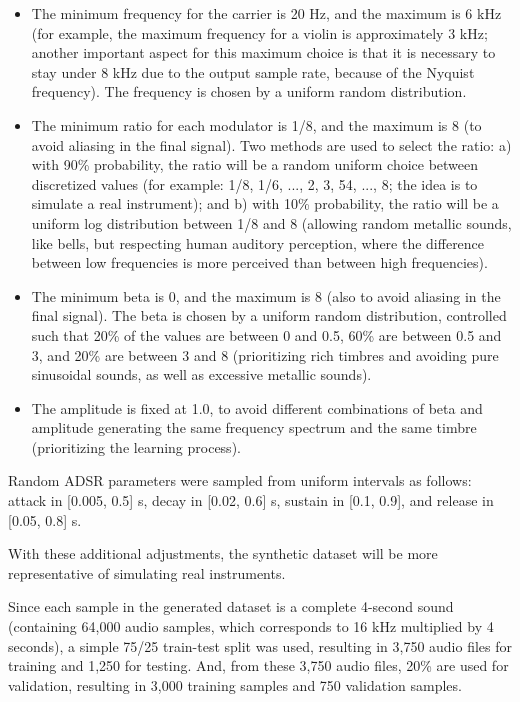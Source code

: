 \documentclass[10pt,conference]{IEEEtran}
\begin{document}
\begin{itemize}
    \item The minimum frequency for the carrier is 20 Hz, and the maximum is 6 kHz (for example, the maximum frequency for a violin is approximately 3 kHz; another important aspect for this maximum choice is that it is necessary to stay under 8 kHz due to the output sample rate, because of the Nyquist frequency). The frequency is chosen by a uniform random distribution.
    \item The minimum ratio for each modulator is 1/8, and the maximum is 8 (to avoid aliasing in the final signal). Two methods are used to select the ratio: a) with 90\% probability, the ratio will be a random uniform choice between discretized values (for example: 1/8, 1/6, ..., 2, 3, 54, ..., 8; the idea is to simulate a real instrument); and b) with 10\% probability, the ratio will be a uniform log distribution between 1/8 and 8 (allowing random metallic sounds, like bells, but respecting human auditory perception, where the difference between low frequencies is more perceived than between high frequencies).
    \item The minimum beta is 0, and the maximum is 8 (also to avoid aliasing in the final signal). The beta is chosen by a uniform random distribution, controlled such that 20\% of the values are between 0 and 0.5, 60\% are between 0.5 and 3, and 20\% are between 3 and 8 (prioritizing rich timbres and avoiding pure sinusoidal sounds, as well as excessive metallic sounds).
    \item The amplitude is fixed at 1.0, to avoid different combinations of beta and amplitude generating the same frequency spectrum and the same timbre (prioritizing the learning process).
\end{itemize}

Random ADSR parameters were sampled from uniform intervals as follows: attack in [0.005, 0.5] s, decay in [0.02, 0.6] s, sustain in [0.1, 0.9], and release in [0.05, 0.8] s.

With these additional adjustments, the synthetic dataset will be more representative of simulating real instruments.

Since each sample in the generated dataset is a complete 4-second sound (containing 64,000 audio samples, which corresponds to 16 kHz multiplied by 4 seconds), a simple 75/25 train-test split was used, resulting in 3,750 audio files for training and 1,250 for testing. And, from these 3,750 audio files, 20\% are used for validation, resulting in 3,000 training samples and 750 validation samples.
\end{document}

